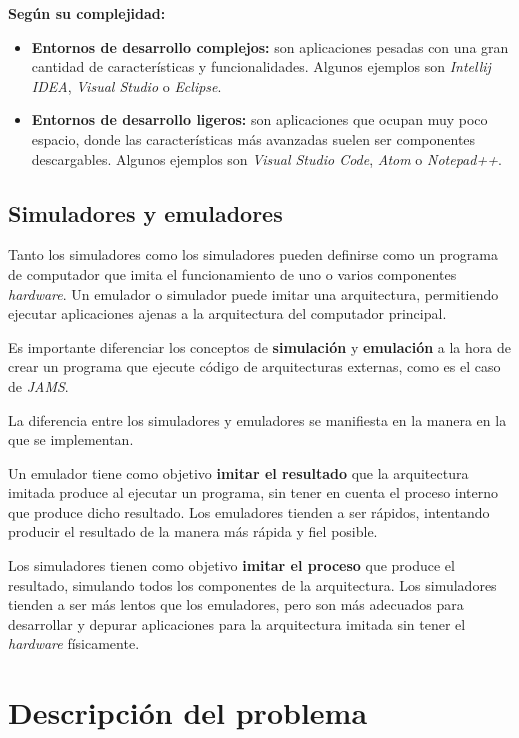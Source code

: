 \noindent \textbf{Según su complejidad:}
\begin{itemize}
    \item \textbf{Entornos de desarrollo complejos:} son aplicaciones pesadas con una gran cantidad de
    características y funcionalidades.
    Algunos ejemplos son \textit{Intellij IDEA},
    \textit{Visual Studio} o \textit{Eclipse}.
    \item \textbf{Entornos de desarrollo ligeros:} son aplicaciones que ocupan muy poco espacio, donde
    las características más avanzadas suelen ser componentes descargables.
    Algunos ejemplos son \textit{Visual Studio Code}, \textit{Atom} o \textit{Notepad++}.
\end{itemize}

\subsection{Simuladores y emuladores}
\label{subsec:simuladores-y-emuladores}

Tanto los simuladores como los simuladores pueden definirse como un
programa de computador que imita el funcionamiento de uno o varios
componentes \textit{hardware}.
Un emulador o simulador puede imitar una arquitectura, permitiendo
ejecutar aplicaciones ajenas a la arquitectura del computador principal.

Es importante diferenciar los conceptos de \textbf{simulación}
y \textbf{emulación} a la hora de crear un programa que ejecute
código de arquitecturas externas, como es el caso de \textit{JAMS}.

\noindent La diferencia entre los simuladores y emuladores se manifiesta
en la manera en la que se implementan.

\noindent Un emulador tiene como objetivo \textbf{imitar el resultado}
que la arquitectura imitada produce al ejecutar un programa, sin tener
en cuenta el proceso interno que produce dicho resultado.
Los emuladores tienden a ser rápidos, intentando producir el resultado
de la manera más rápida y fiel posible.

\noindent Los simuladores tienen como objetivo \textbf{imitar el proceso}
que produce el resultado, simulando todos los componentes de la arquitectura.
Los simuladores tienden a ser más lentos que los emuladores, pero son más
adecuados para desarrollar y depurar aplicaciones para la arquitectura
imitada sin tener el \textit{hardware} físicamente.


\section{Descripción del problema}\label{sec:descripcion-del-problema}

